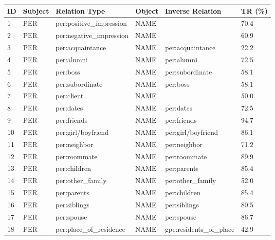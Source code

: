 \documentclass[11pt,a4paper]{article}
\begin{document}
\begin{table*}[ht!]
\centering
\footnotesize
\begin{tabular}{llllll}
\toprule
\bf ID & \bf Subject & \bf{Relation Type}  & \bf Object     & \bf Inverse Relation  & \bf TR (\%)\\
\midrule
1 & PER  & per:positive\_impression             & NAME      &                       & 70.4  \\
2 & PER  & per:negative\_impression             & NAME      &                       & 60.9 \\ 3 & PER  & per:acquaintance                     & NAME      & per:acquaintance      & 22.2 \\
4 & PER  & per:alumni                           & NAME      & per:alumni            & 72.5 \\
5 & PER  & per:boss                             & NAME      & per:subordinate       & 58.1 \\
6 & PER  & per:subordinate                      & NAME      & per:boss              & 58.1 \\
7 & PER  & per:client                           & NAME      &                       & 50.0 \\
8 & PER  & per:dates                            & NAME      & per:dates             & 72.5 \\
9 & PER  & per:friends                          & NAME      & per:friends           & 94.7 \\
10 & PER  & per:girl/boyfriend                   & NAME     & per:girl/boyfriend    & 86.1 \\
11 & PER  & per:neighbor                         & NAME     & per:neighbor          & 71.2 \\
12 & PER  & per:roommate                         & NAME     & per:roommate          & 89.9\\
13 & PER  & per:children                 & NAME     & per:parents           & 85.4\\
14 & PER  & per:other\_family            & NAME     & per:other\_family     & 52.0\\
15 & PER  & per:parents                  & NAME     & per:children          & 85.4\\
16 & PER  & per:siblings                 & NAME     & per:siblings          & 80.5\\
17 & PER  & per:spouse                   & NAME     & per:spouse            & 86.7\\
18 & PER  & per:place\_of\_residence             & NAME     &  gpe:residents\_of\_place    & 42.9  \\

\end{tabular}
\end{table*}
\end{document}
